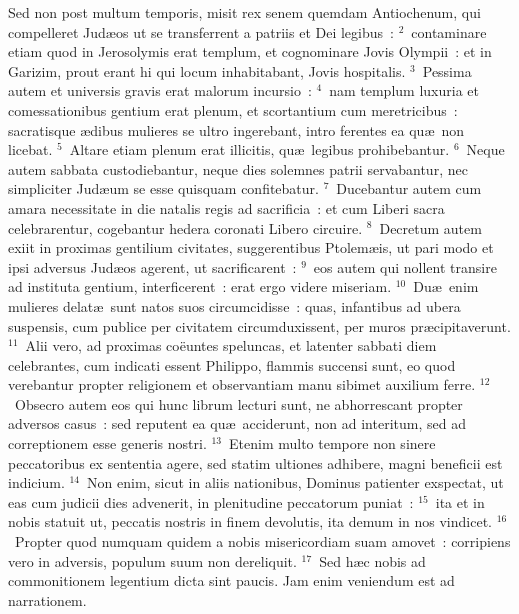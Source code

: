 \bchapter
\lettrine[lines=3,image=true,loversize=0.05,lraise=-0.03]{S}{}ed non post multum temporis, misit rex senem quemdam Antiochenum, qui compelleret Jud\ae os ut se transferrent a patriis et Dei legibus~:
${}^{2}$~contaminare etiam quod in Jerosolymis erat templum, et cognominare Jovis Olympii~: et in Garizim, prout erant hi qui locum inhabitabant, Jovis hospitalis.
${}^{3}$~Pessima autem et universis gravis erat malorum incursio~:
${}^{4}$~nam templum luxuria et comessationibus gentium erat plenum, et scortantium cum meretricibus~: sacratisque \ae dibus mulieres se ultro ingerebant, intro ferentes ea qu\ae\ non licebat.
${}^{5}$~Altare etiam plenum erat illicitis, qu\ae\ legibus prohibebantur.
${}^{6}$~Neque autem sabbata custodiebantur, neque dies solemnes patrii servabantur, nec simpliciter Jud\ae um se esse quisquam confitebatur.
${}^{7}$~Ducebantur autem cum amara necessitate in die natalis regis ad sacrificia~: et cum Liberi sacra celebrarentur, cogebantur hedera coronati Libero circuire.
${}^{8}$~Decretum autem exiit in proximas gentilium civitates, suggerentibus Ptolem\ae is, ut pari modo et ipsi adversus Jud\ae os agerent, ut sacrificarent~:
${}^{9}$~eos autem qui nollent transire ad instituta gentium, interficerent~: erat ergo videre miseriam.
${}^{10}$~Du\ae\ enim mulieres delat\ae\ sunt natos suos circumcidisse~: quas, infantibus ad ubera suspensis, cum publice per civitatem circumduxissent, per muros pr\ae cipitaverunt.
${}^{11}$~Alii vero, ad proximas co\"euntes speluncas, et latenter sabbati diem celebrantes, cum indicati essent Philippo, flammis succensi sunt, eo quod verebantur propter religionem et observantiam manu sibimet auxilium ferre.
${}^{12}$~Obsecro autem eos qui hunc librum lecturi sunt, ne abhorrescant propter adversos casus~: sed reputent ea qu\ae\ acciderunt, non ad interitum, sed ad correptionem esse generis nostri.
${}^{13}$~Etenim multo tempore non sinere peccatoribus ex sententia agere, sed statim ultiones adhibere, magni beneficii est indicium.
${}^{14}$~Non enim, sicut in aliis nationibus, Dominus patienter exspectat, ut eas cum judicii dies advenerit, in plenitudine peccatorum puniat~:
${}^{15}$~ita et in nobis statuit ut, peccatis nostris in finem devolutis, ita demum in nos vindicet.
${}^{16}$~Propter quod numquam quidem a nobis misericordiam suam amovet~: corripiens vero in adversis, populum suum non dereliquit.
${}^{17}$~Sed h\ae c nobis ad commonitionem legentium dicta sint paucis. Jam enim veniendum est ad narrationem.


